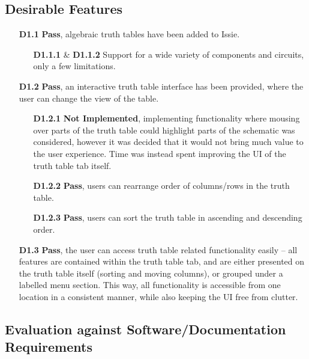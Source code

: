 \subsection*{Desirable Features}
\begin{itemize}
    \item[\textbf{D1.1}] \textbf{Pass}, algebraic truth tables have been added to Issie.
    \begin{itemize}
        \item[\textbf{D1.1.1} \& \textbf{D1.1.2}] Support for a wide variety of components and circuits, only a few limitations.
    \end{itemize}
    \medskip
    \item[\textbf{D1.2}] \textbf{Pass}, an interactive truth table interface has been provided, where the user can change the view of the table.
    \begin{itemize}
        \item[\textbf{D1.2.1}] \textbf{Not Implemented}, implementing functionality where mousing over parts of the truth table could highlight parts of the schematic was considered, however it was decided that it would not bring much value to the user experience. Time was instead spent improving the UI of the truth table tab itself.
        \item[\textbf{D1.2.2}] \textbf{Pass}, users can rearrange order of columns/rows in the truth table.
        \item[\textbf{D1.2.3}] \textbf{Pass}, users can sort the truth table in ascending and descending order.
    \end{itemize}
    \medskip
    \item[\textbf{D1.3}] \textbf{Pass}, the user can access truth table related functionality easily -- all features are contained within the truth table tab, and are either presented on the truth table itself (sorting and moving columns), or grouped under a labelled menu section. This way, all functionality is accessible from one location in a consistent manner, while also keeping the UI free from clutter.
\end{itemize}

\subsection{Evaluation against Software/Documentation Requirements}
